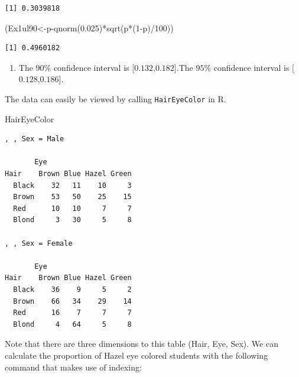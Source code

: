 \documentclass[
  letterpaper,
  DIV=11,
  numbers=noendperiod]{scrreprt}
\newenvironment{Shaded}{\begin{snugshade}}{\end{snugshade}}
\newcommand{\DecValTok}[1]{\textcolor[rgb]{0.68,0.00,0.00}{#1}}
\newcommand{\FloatTok}[1]{\textcolor[rgb]{0.68,0.00,0.00}{#1}}
\newcommand{\FunctionTok}[1]{\textcolor[rgb]{0.28,0.35,0.67}{#1}}
\newcommand{\NormalTok}[1]{\textcolor[rgb]{0.00,0.23,0.31}{#1}}
\newcommand{\OtherTok}[1]{\textcolor[rgb]{0.00,0.23,0.31}{#1}}
\newcommand{\SpecialCharTok}[1]{\textcolor[rgb]{0.37,0.37,0.37}{#1}}
\providecommand{\tightlist}{%
  \setlength{\itemsep}{0pt}\setlength{\parskip}{0pt}}\usepackage{longtable,booktabs,array}
\begin{document}
\begin{verbatim}
[1] 0.3039818
\end{verbatim}

\begin{Shaded}
\begin{Highlighting}[numbers=left,,]
\NormalTok{(Ex1ul90}\OtherTok{\textless{}{-}}\NormalTok{p}\SpecialCharTok{{-}}\FunctionTok{qnorm}\NormalTok{(}\FloatTok{0.025}\NormalTok{)}\SpecialCharTok{*}\FunctionTok{sqrt}\NormalTok{(p}\SpecialCharTok{*}\NormalTok{(}\DecValTok{1}\SpecialCharTok{{-}}\NormalTok{p)}\SpecialCharTok{/}\DecValTok{100}\NormalTok{))}
\end{Highlighting}
\end{Shaded}

\begin{verbatim}
[1] 0.4960182
\end{verbatim}

\begin{enumerate}
\def\labelenumi{\arabic{enumi}.}
\setcounter{enumi}{1}
\tightlist
\item
  The \(90\)\% confidence interval is {[}\(0.132\),\(0.182\){]}.The
  \(95\)\% confidence interval is {[}\(0.128\),\(0.186\){]}.
\end{enumerate}

The data can easily be viewed by calling \texttt{HairEyeColor} in R.

\begin{Shaded}
\begin{Highlighting}[numbers=left,,]
\NormalTok{HairEyeColor}
\end{Highlighting}
\end{Shaded}

\begin{verbatim}
, , Sex = Male

       Eye
Hair    Brown Blue Hazel Green
  Black    32   11    10     3
  Brown    53   50    25    15
  Red      10   10     7     7
  Blond     3   30     5     8

, , Sex = Female

       Eye
Hair    Brown Blue Hazel Green
  Black    36    9     5     2
  Brown    66   34    29    14
  Red      16    7     7     7
  Blond     4   64     5     8
\end{verbatim}

Note that there are three dimensions to this table (Hair, Eye, Sex). We
can calculate the proportion of Hazel eye colored students with the
following command that makes use of indexing:
\end{document}
